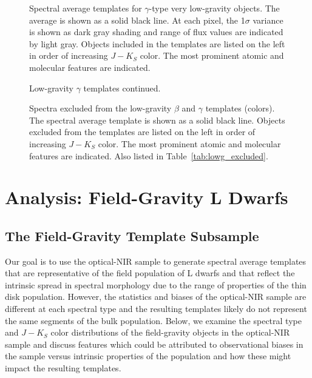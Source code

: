 \documentclass[12pt]{aastex6}
\begin{document}
\begin{figure}
  \caption{Spectral average templates for $\gamma$-type very low-gravity objects. The average is shown as a solid black line. At each pixel, the 1$\sigma$ variance is shown as dark gray shading and range of flux values are indicated by light gray. Objects included in the templates are listed on the left in order of increasing $J-K_S$ color. The most prominent atomic and molecular features are indicated. }
  \label{fig:gamma_templates}
\end{figure}

\begin{figure}
  \caption{Low-gravity $\gamma$ templates continued.}
\end{figure}

\begin{figure}
  \caption{Spectra excluded from the low-gravity $\beta$ and $\gamma$ templates (colors). The spectral average template is shown as a solid black line. Objects excluded from the templates are listed on the left in order of increasing $J-K_S$ color. The most prominent atomic and molecular features are indicated. Also listed in Table~\ref{tab:lowg_excluded}.}
  \label{fig:lowg_excluded}
\end{figure}

\clearpage



\clearpage



\section{Analysis: Field-Gravity L Dwarfs}
\label{sec:fieldg}

\subsection{The Field-Gravity Template Subsample}
\label{sec:templates_normal}

Our goal is to use the optical-NIR sample to generate spectral average templates that are representative of the field population of L dwarfs and that reflect the intrinsic spread in spectral morphology due to the range of properties of the thin disk population.
However, the statistics and biases of the optical-NIR sample are different at each spectral type and the resulting templates likely do not represent the same segments of the bulk population.
Below, we examine the spectral type and $J-K_S$ color distributions of the field-gravity objects in the optical-NIR sample and discuss features which could be attributed to observational biases in the sample versus intrinsic properties of the population and how these might impact the resulting templates.
\end{document}
